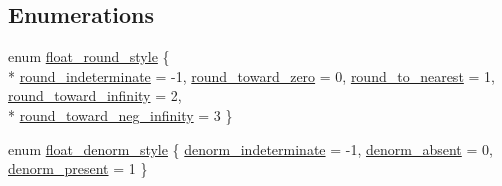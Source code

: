 \subsection*{Enumerations}
\begin{DoxyCompactItemize}
\item 
enum \hyperlink{limits-hack_8h_a3bdaf6c7e8a65859bf550443989c5a66}{float\+\_\+round\+\_\+style} \{ \\*
\hyperlink{limits-hack_8h_a3bdaf6c7e8a65859bf550443989c5a66aef8e73dd0b0f1899790b6ba2bb47be7d}{round\+\_\+indeterminate} = -\/1, 
\hyperlink{limits-hack_8h_a3bdaf6c7e8a65859bf550443989c5a66a2378935a2849c4d049d5e5a01324e827}{round\+\_\+toward\+\_\+zero} = 0, 
\hyperlink{limits-hack_8h_a3bdaf6c7e8a65859bf550443989c5a66aae97e229f8502c244371d7f7e3105afc}{round\+\_\+to\+\_\+nearest} = 1, 
\hyperlink{limits-hack_8h_a3bdaf6c7e8a65859bf550443989c5a66a33f65225750a8f3edc0b6601fa7bcd52}{round\+\_\+toward\+\_\+infinity} = 2, 
\\*
\hyperlink{limits-hack_8h_a3bdaf6c7e8a65859bf550443989c5a66ad9c511acb4735515f2402087641e9725}{round\+\_\+toward\+\_\+neg\+\_\+infinity} = 3
 \}
\item 
enum \hyperlink{limits-hack_8h_a592fe78d9bf66455d12aa075f36313b6}{float\+\_\+denorm\+\_\+style} \{ \hyperlink{limits-hack_8h_a592fe78d9bf66455d12aa075f36313b6ae6e5a92659b76e353da685746ec7a715}{denorm\+\_\+indeterminate} = -\/1, 
\hyperlink{limits-hack_8h_a592fe78d9bf66455d12aa075f36313b6ae1126f121e8e78fad4c2ea93b9154f70}{denorm\+\_\+absent} = 0, 
\hyperlink{limits-hack_8h_a592fe78d9bf66455d12aa075f36313b6ace9911a51bfc23dca58b86c67b0adfac}{denorm\+\_\+present} = 1
 \}
\end{DoxyCompactItemize}
